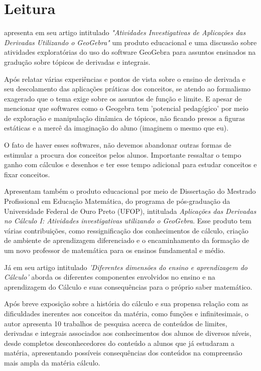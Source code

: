 \documentclass[
	12pt,				%
	openright,			%
	oneside,
	a4paper,			%
	chapter=TITLE,		%
	section=TITLE,		%
	sumario=abnt-6027-2012,
	english,			%
	brazil				%
]{abntex2}
\begin{document}
		
	\section{Leitura} 
		 apresenta em seu artigo intitulado \textit{"Atividades Investigativas de Aplicações das
			Derivadas Utilizando o GeoGebra"} um produto educacional e uma discussão sobre atividades exploratórias do uso do software GeoGebra para assuntos ensinados na gradução sobre tópicos de derivadas e integrais.
		
		Após relatar várias experiências e pontos de vista sobre o ensino de derivada e seu descolamento das aplicações práticas dos conceitos, se atendo ao formalismo exagerado que o tema exige sobre os assuntos de função e limite. E apesar de mencionar que softwares como o Geogebra tem 'potencial pedagógico' por meio de exploração e manipulação dinâmica de tópicos, não ficando presos a figuras estáticas e a mercê da imaginação do aluno (imaginem o mesmo que eu).
		
		O fato de haver esses softwares, não devemos abandonar outras formas de estimular a procura dos conceitos pelos alunos. Importante ressaltar o tempo ganho com cálculos e desenhos e ter esse tempo adicional para estudar conceitos e fixar conceitos.
		
		Apresentam também o produto educacional por meio de Dissertação do Mestrado Profissional em Educação Matemática, do programa
		de pós-graduação da Universidade Federal de Ouro Preto (UFOP), intitulada \textit{Aplicações das Derivadas no Cálculo I: Atividades investigativas utilizando o GeoGebra}. Esse produto tem várias contribuições, como ressignificação dos conhecimentos de cálculo, criação de ambiente de aprendizagem diferenciado e o encaminhamento da formação de um novo professor de matemática para os ensinos fundamental e médio.
		
		Já  em seu artigo intitulado \textit{'Diferentes dimensões do ensino e aprendizagem do Cálculo'} aborda os diferentes componentes envolvidos no ensino e na aprendizagem do Cálculo e suas consequências para o próprio saber matemático.
		
		Após breve exposição sobre a história do cálculo e sua propensa relação com as dificuldades inerentes aos conceitos da matéria, como funções e infinitesimais, o autor apresenta 10 trabalhos de pesquisa acerca de conteúdos de limites, derivadas e integrais associados aos conhecimentos dos alunos de diversos níveis, desde completos desconhecedores do conteúdo a alunos que já estudaram a matéria, apresentando possíveis consequências dos conteúdos na compreensão mais ampla da matéria cálculo.  
		
\end{document}
